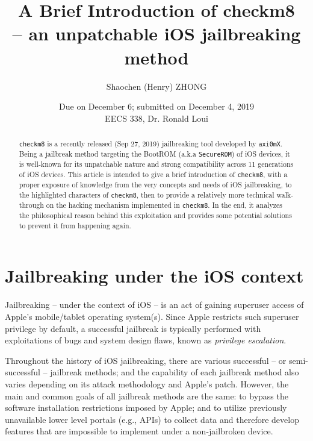 \documentclass[10pt]{article}
\newcommand{\inlinecode}{\texttt}
\begin{document}
\linespread{1}


\title{\textbf{A Brief Introduction of checkm8} \\
        \large \textbf{-- an unpatchable iOS jailbreaking method\\}}

\author{Shaochen (Henry) ZHONG}
\date{Due on December 6; submitted on December 4, 2019\\EECS 338, Dr. Ronald Loui}
\maketitle

\begin{abstract}
    \inlinecode{checkm8} is a recently released (Sep 27, 2019) jailbreaking tool developed by \inlinecode{axi0mX}. Being a jailbreak method targeting the BootROM (a.k.a \inlinecode{SecureROM}) of iOS devices, it is well-known for its unpatchable nature and strong compatibility across 11 generations of iOS devices. This article is intended to give a brief introduction of \inlinecode{checkm8}, with a proper exposure of knowledge from the very concepts and needs of iOS jailbreaking, to the highlighted characters of \inlinecode{checkm8}, then to provide a relatively more technical walk-through on the hacking mechanism implemented in \inlinecode{checkm8}. In the end, it analyzes the philosophical reason behind this exploitation and provides some potential solutions to prevent it from happening again.
\end{abstract}





\vspace{0.5cm}
{\hypersetup{hidelinks}
\tableofcontents
}


\newpage

\section{Jailbreaking under the iOS context}

Jailbreaking -- under the context of iOS -- is an act of gaining superuser access of Apple's mobile/tablet operating system(s). Since Apple restricts such superuser privilege by default, a successful jailbreak is typically performed with exploitations of bugs and system design flaws, known as \textit{privilege escalation}.

Throughout the history of iOS jailbreaking, there are various successful -- or semi-successful -- jailbreak methods; and the capability of each jailbreak method also varies depending on its attack methodology and Apple's patch. However, the main and common goals of all jailbreak methods are the same: to bypass the software installation restrictions imposed by Apple; and to utilize previously unavailable lower level portals (e.g., APIs) to collect data and therefore develop features that are impossible to implement under a non-jailbroken device.
\end{document}
